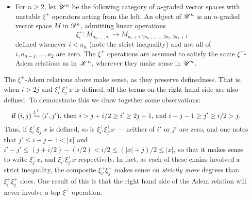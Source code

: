 \documentclass[11pt]{article}
\newcommand{\LL}[1]{{\scrK}^{#1}}%
\newcommand{\GR}[1]{\scrG^{#1}}%
\newcommand{\nontop}[1]{\scrU^{#1}}%
\newcommand{\produces}[1]{\overset{#1}{\rightsquigarrow}}
\newcommand{\LambdaOp}{\xi^{+}}
\begin{document}
\begin{CategoriesOfInterest}
\begin{itemize}

\item For $n\geq2$, let $\nontop{n}$ be the following category of $n$-graded vector spaces with unstable $\LambdaOp$ operators acting from the left. An object of $\nontop{n}$ is an $n$-graded vector space $M$ in $\GR{n}$,
admitting linear operations
\[\LambdaOp_i:M_{a_n,\ldots,a_1}\to M_{a_n+i,2a_{n-1},\ldots,2a_2,2a_1+1}\]
defined whenever $i< a_n$ (note the strict inequality) and not all of $i,a_{n-1},\ldots,a_{2}$ are zero.
The $\LambdaOp$ operations are assumed to satisfy the same $\LambdaOp$-Adem relations as in $\LL{n}$, wherever they make sense in $\nontop{n}$. %
\end{itemize}
The $\LambdaOp$-Adem relations above make sense, as they preserve definedness. That is, when $i>2j$ and $\LambdaOp_i\LambdaOp_jx$ is defined, all the terms on the right hand side are also defined. To demonstrate this we draw together some observations:
\[\textup{if $(i,j)\produces{\LambdaOp}(i',j')$, then $i>j+i/2\geq i'\geq2j+1$, and $i-j-1\geq j'\geq i/2>j$.}\]
Thus, if $\LambdaOp_i\LambdaOp_jx$ is defined, so is $\LambdaOp_{i'}\LambdaOp_{j'}x$ --- neither of $i'$ or $j'$ are zero, and one notes that $j'\leq i-j-1<|x|$ and $i'-j'\leq (j+i/2)-(i/2)<i/2\leq(|x|+j)/2\leq |x|$, so that it makes sense to write $\LambdaOp_{j'}x$, and $\LambdaOp_{i'}\LambdaOp_{j'}x$ respectively. In fact, as each of these chains involved a strict inequality, the composite $\LambdaOp_{i'}\LambdaOp_{j'}$ makes sense on \emph{strictly more} degrees than $\LambdaOp_{i}\LambdaOp_{j}$ does. One result of this is that the right hand side of the Adem relation will never involve a top $\LambdaOp$-operation.


\end{CategoriesOfInterest}
\end{document}
